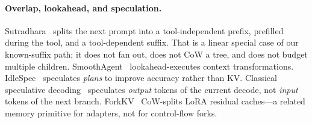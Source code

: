 \paragraph{Overlap, lookahead, and speculation.}
Sutradhara~\cite{sutradhara} splits the next prompt into a tool-independent prefix, prefilled during the tool, and a tool-dependent suffix.
That is a linear special case of our known-suffix path; it does not fan out, does not CoW a tree, and does not budget multiple children.
SmoothAgent~\cite{smoothagent} lookahead-executes context transformations.
IdleSpec~\cite{idlespec} speculates \emph{plans} to improve accuracy rather than KV.
Classical speculative decoding~\cite{speculative,medusa,eagledraft} speculates \emph{output} tokens of the current decode, not \emph{input} tokens of the next branch.
ForkKV~\cite{forkkv} CoW-splits LoRA residual caches---a related memory primitive for adapters, not for control-flow forks.


